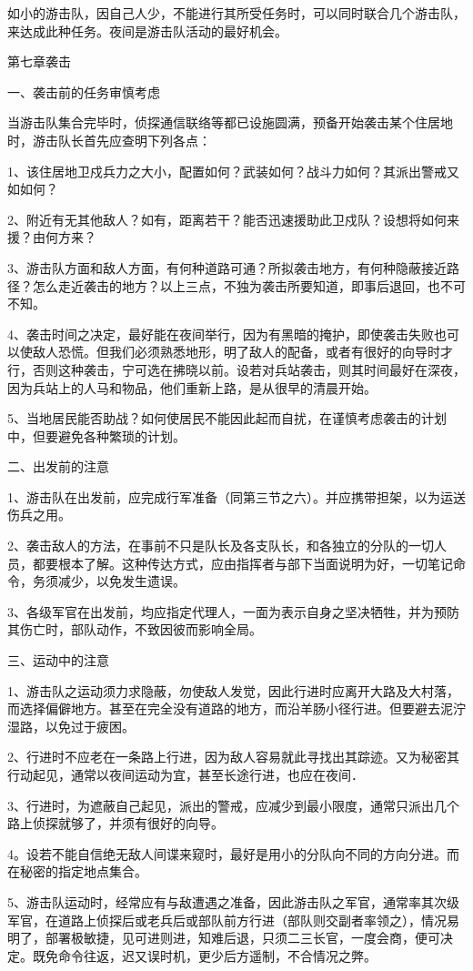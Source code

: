 如小的游击队，因自己人少，不能进行其所受任务时，可以同时联合几个游击队，来达成此种任务。夜间是游击队活动的最好机会。

第七章袭击

一、袭击前的任务审慎考虑

当游击队集合完毕时，侦探通信联络等都已设施圆满，预备开始袭击某个住居地时，游击队长首先应查明下列各点：

1、该住居地卫戍兵力之大小，配置如何？武装如何？战斗力如何？其派出警戒又如如何？

2、附近有无其他敌人？如有，距离若干？能否迅速援助此卫戍队？设想将如何来援？由何方来？

3、游击队方面和敌人方面，有何种道路可通？所拟袭击地方，有何种隐蔽接近路径？怎么走近袭击的地方？以上三点，不独为袭击所要知道，即事后退回，也不可不知。

4、袭击时间之决定，最好能在夜间举行，因为有黑暗的掩护，即使袭击失败也可以使敌人恐慌。但我们必须熟悉地形，明了敌人的配备，或者有很好的向导时才行，否则这种袭击，宁可选在拂晓以前。设若对兵站袭击，则其时间最好在深夜，因为兵站上的人马和物品，他们重新上路，是从很早的清晨开始。

5、当地居民能否助战？如何使居民不能因此起而自扰，在谨慎考虑袭击的计划中，但要避免各种繁琐的计划。

二、出发前的注意

1、游击队在出发前，应完成行军准备（同第三节之六）。并应携带担架，以为运送伤兵之用。

2、袭击敌人的方法，在事前不只是队长及各支队长，和各独立的分队的一切人员，都要根本了解。这种传达方式，应由指挥者与部下当面说明为好，一切笔记命令，务须减少，以免发生遗误。

3、各级军官在出发前，均应指定代理人，一面为表示自身之坚决牺牲，并为预防其伤亡时，部队动作，不致因彼而影响全局。

三、运动中的注意

1、游击队之运动须力求隐蔽，勿使敌人发觉，因此行进时应离开大路及大村落，而选择偏僻地方。甚至在完全没有道路的地方，而沿羊肠小径行进。但要避去泥泞湿路，以免过于疲困。

2、行进时不应老在一条路上行进，因为敌人容易就此寻找出其踪迹。又为秘密其行动起见，通常以夜间运动为宜，甚至长途行进，也应在夜间．

3、行进时，为遮蔽自己起见，派出的警戒，应减少到最小限度，通常只派出几个路上侦探就够了，并须有很好的向导。

4。设若不能自信绝无敌人间谍来窥时，最好是用小的分队向不同的方向分进。而在秘密的指定地点集合。

5、游击队运动时，经常应有与敌遭遇之准备，因此游击队之军官，通常率其次级军官，在道路上侦探后或老兵后或部队前方行进（部队则交副者率领之），情况易明了，部署极敏捷，见可进则进，知难后退，只须二三长官，一度会商，便可决定。既免命令往返，迟又误时机，更少后方遥制，不合情况之弊。

